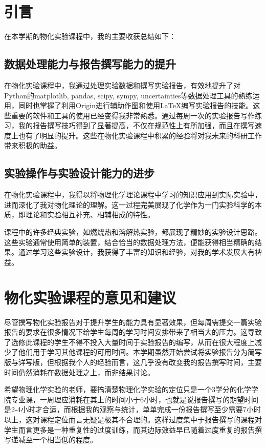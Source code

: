 \newpage

\section{引言}

在本学期的物化实验课程中，我的主要收获总结如下：

\subsection{数据处理能力与报告撰写能力的提升}

在物化实验课程中，我通过处理实验数据和撰写实验报告，有效地提升了对Python的matplotlib, pandas, scipy, sympy, uncertainties等数据处理工具的熟练运用，同时也掌握了利用Origin进行辅助作图和使用LaTeX编写实验报告的技能。这些重要的软件和工具的使用已经变得我非常熟悉。通过每周一次的实验报告写作练习，我的报告撰写技巧得到了显著提高，不仅在规范性上有所加强，而且在撰写速度上也有了明显的提升。这些在物化实验课程中积累的经验将对我未来的科研工作带来积极的助益。

\subsection{实验操作与实验设计能力的进步}

在物化实验课程中，我得以将物理化学理论课程中学习的知识应用到实际实验中，进而深化了我对物化理论的理解。这一过程完美展现了化学作为一门实验科学的本质，即理论和实验相互补充、相辅相成的特性。

课程中的许多经典实验，如燃烧热和溶解热实验，都展现了精妙的实验设计思路。这些实验通常使用简单的装置，结合恰当的数据处理方法，便能获得相当精确的结果。通过学习这些实验设计，我获得了丰富的知识和经验，对我的学术发展大有裨益。


\section{物化实验课程的意见和建议}

尽管撰写物化实验报告对于提升学生的能力具有显著效果，但每周需提交一篇实验报告的要求在很多情况下给学生每周的学习时间安排带来了相当大的压力。这导致了选修此课程的学生不得不投入大量时间于实验报告的编写，从而在很大程度上减少了他们用于学习其他课程的可用时间。本学期虽然开始尝试将实验报告分为简写版与详写版，但根据我个人的经验而言，这几乎没有改变我的报告撰写时间，主要时间仍然消耗在数据处理之上，而非结果讨论。

希望物理化学实验的老师，要搞清楚物理化学实验的定位只是一个3学分的化学学院专业课，一周理应消耗在其上的时间小于6小时，也就是说报告撰写的期望时间是2-4小时才合适，而根据我的观察与统计，单单完成一份报告撰写至少需要7小时以上，这对课程定位而言无疑是极其不合理的。这样过度集中于报告撰写的课程对学生而言更多是一种重复性的过度训练，而其边际效益早已随着过度重复的报告撰写递减至一个相当低的程度。

